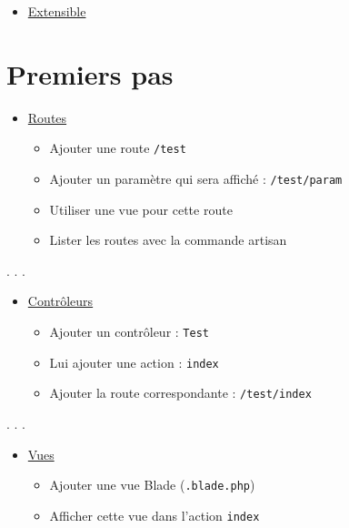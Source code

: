 \begin{itemize}
\tightlist
\item
  \href{https://laravel.com/docs/master/artisan}{Extensible}
\end{itemize}

\hypertarget{premiers-pas}{%
\section{Premiers pas}\label{premiers-pas}}

\begin{itemize}
\tightlist
\item
  \href{https://laravel.com/docs/master/routing}{Routes}

  \begin{itemize}
  \tightlist
  \item
    Ajouter une route \textenglish{\texttt{/test}}
  \item
    Ajouter un paramètre qui sera affiché :
    \textenglish{\texttt{/test/param}}
  \item
    Utiliser une vue pour cette route
  \item
    Lister les routes avec la commande artisan
  \end{itemize}
\end{itemize}

. . .

\begin{itemize}
\tightlist
\item
  \href{https://laravel.com/docs/master/controllers}{Contrôleurs}

  \begin{itemize}
  \tightlist
  \item
    Ajouter un contrôleur : \textenglish{\texttt{Test}}
  \item
    Lui ajouter une action : \textenglish{\texttt{index}}
  \item
    Ajouter la route correspondante : \textenglish{\texttt{/test/index}}
  \end{itemize}
\end{itemize}

. . .

\begin{itemize}
\tightlist
\item
  \href{https://laravel.com/docs/master/views}{Vues}

  \begin{itemize}
  \tightlist
  \item
    Ajouter une vue Blade (\textenglish{\texttt{.blade.php}})
  \item
    Afficher cette vue dans l'action \textenglish{\texttt{index}}
  \end{itemize}
\end{itemize}

